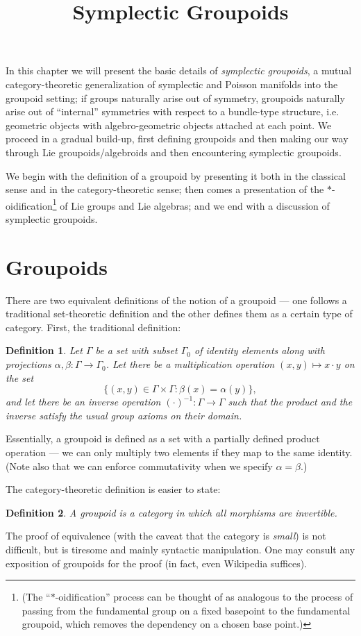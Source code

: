 \documentclass{tufte-handout}
\title{Symplectic Groupoids}
\newtheorem{defn}{Definition}
\begin{document}
In this chapter we will present the basic details of \emph{symplectic groupoids}, a mutual category-theoretic generalization of symplectic and Poisson manifolds into the groupoid setting; if groups naturally arise out of symmetry, groupoids naturally arise out of ``internal'' symmetries with respect to a bundle-type structure, i.e. geometric objects with algebro-geometric objects attached at each point. We proceed in a gradual build-up, first defining groupoids and then making our way through Lie groupoids/algebroids and then encountering symplectic groupoids.

We begin with the definition of a groupoid by presenting it both in the classical sense and in the category-theoretic sense; then comes a presentation of the $*$-oidification\footnote{(The ``$*$-oidification'' process can be thought of as analogous to the process of passing from the fundamental group on a fixed basepoint to the fundamental groupoid, which removes the dependency on a chosen base point.)} of Lie groups and Lie algebras; and we end with a discussion of symplectic groupoids.

\section{Groupoids}
There are two equivalent definitions of the notion of a groupoid --- one follows a traditional set-theoretic definition and the other defines them as a certain type of category. First, the traditional definition:

\begin{defn}
Let $\Gamma$ be a set with subset $\Gamma_0$ of \emph{identity elements} along with projections $\alpha, \beta: \Gamma \to \Gamma_0$. Let there be a multiplication operation $(x,y) \mapsto x \cdot y$ on the set
$$
\{(x,y) \in \Gamma \times \Gamma : \beta(x) = \alpha(y)\},
$$
and let there be an inverse operation $(\cdot)^{-1}: \Gamma \to \Gamma$ such that the product and the inverse satisfy the usual group axioms on their domain.
\end{defn}
Essentially, a groupoid is defined as a set with a partially defined product operation --- we can only multiply two elements if they map to the same identity. (Note also that we can enforce commutativity when we specify $\alpha = \beta$.)

The category-theoretic definition is easier to state:
\begin{defn}
A \emph{groupoid} is a category in which all morphisms are invertible.
\end{defn}
The proof of equivalence (with the caveat that the category is \emph{small}) is not difficult, but is tiresome and mainly syntactic manipulation. One may consult any exposition of groupoids for the proof (in fact, even Wikipedia suffices).
\end{document}
